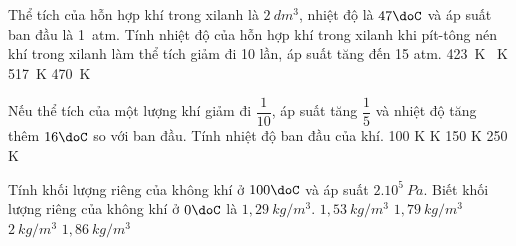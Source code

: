 \begin{ex} %
	Thể tích của hỗn hợp khí trong xilanh là $2\ dm^3$, nhiệt độ là $47\doC$ và áp suất ban đầu là 1\ atm. Tính nhiệt độ của hỗn hợp khí trong xilanh khi pít-tông nén khí trong xilanh làm thể tích giảm đi 10 lần, áp suất tăng đến 15 atm.
	\choice
	{423\ K}
	{\ K}
	{517\ K}
	{470\ K}
\end{ex}
\begin{ex} %
	Nếu thể tích của một lượng khí giảm đi $\dfrac{1}{10}$, áp suất tăng $\dfrac{1}{5}$ và nhiệt độ tăng thêm $16\doC$ so với ban đầu. Tính nhiệt độ ban đầu của khí.
	\choice
	{100 K}
	{ K}
	{150 K}
	{250 K}
\end{ex}
\begin{ex} %
	Tính khối lượng riêng của không khí ở $100\doC$ và áp suất $2.10^5\ Pa$. Biết khối lượng riêng của không khí ở $0\doC$ là $1,29\ kg/m^3$.
	\choice
	{$1,53\ kg/m^3$}
	{$1,79\ kg/m^3$}
	{$2\ kg/m^3$}
	{\True $1,86\ kg/m^3$}
\end{ex}

